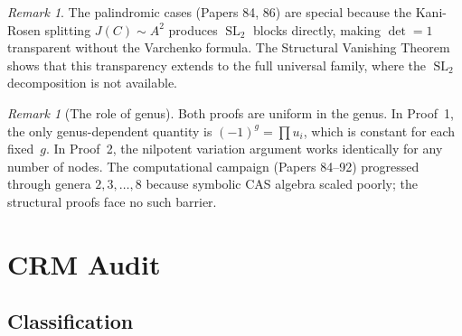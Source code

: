 \documentclass[11pt]{article}
\theoremstyle{plain}
\theoremstyle{definition}
\theoremstyle{remark}
\newtheorem{remark}[theorem]{Remark}
\newcommand{\SL}{\operatorname{SL}}
\begin{document}
\begin{remark}
  The palindromic cases (Papers 84, 86) are special because the
  Kani-Rosen splitting $J(C) \sim A^2$ produces $\SL_2$ blocks
  directly, making $\det = 1$ transparent without the Varchenko
  formula.  The Structural Vanishing Theorem shows that this
  transparency extends to the full universal family, where the
  $\SL_2$ decomposition is not available.
\end{remark}

\begin{remark}[The role of genus]
  Both proofs are uniform in the genus.  In Proof~1, the only
  genus-dependent quantity is $(-1)^g = \prod u_i$, which is
  constant for each fixed~$g$.  In Proof~2, the nilpotent
  variation argument works identically for any number of nodes.
  The computational campaign (Papers 84--92) progressed through
  genera $2, 3, \ldots, 8$ because symbolic CAS algebra scaled
  poorly; the structural proofs face no such barrier.
\end{remark}


\section{CRM Audit}\label{sec:crm}

\subsection{Classification}
\end{document}
